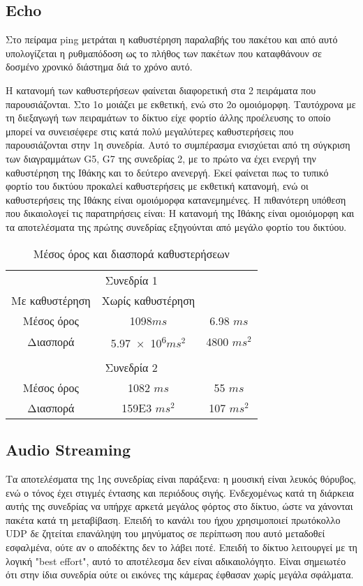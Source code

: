 \documentclass[a4paper,10pt]{article}
\begin{document}
\subsection{\foreignlanguage{english}{Echo}}
Στο πείραμα \foreignlanguage{english}{ping} μετράται η καθυστέρηση παραλαβής του πακέτου και από αυτό υπολογίζεται η ρυθμαπόδοση ως το πλήθος των πακέτων που καταφθάνουν σε δοσμένο χρονικό διάστημα διά το χρόνο αυτό.

Η κατανομή των καθυστερήσεων φαίνεται διαφορετική στα 2 πειράματα που παρουσιάζονται. Στο 1ο μοιάζει με εκθετική, ενώ στο 2ο ομοιόμορφη. Ταυτόχρονα με τη διεξαγωγή των πειραμάτων το δίκτυο είχε φορτίο άλλης προέλευσης το οποίο μπορεί να συνεισέφερε στις κατά πολύ μεγαλύτερες καθυστερήσεις που παρουσιάζονται στην 1η συνεδρία. Αυτό το συμπέρασμα ενισχύεται από τη σύγκριση των διαγραμμάτων \foreignlanguage{english}{G5, G7} της συνεδρίας 2, με το πρώτο να έχει ενεργή την καθυστέρηση της Ιθάκης και το δεύτερο ανενεργή. Εκεί φαίνεται πως το τυπικό φορτίο του δικτύου προκαλεί καθυστερήσεις με εκθετική κατανομή, ενώ οι καθυστερήσεις της Ιθάκης είναι ομοιόμορφα κατανεμημένες. Η πιθανότερη υπόθεση που δικαιολογεί τις παρατηρήσεις είναι: Η κατανομή της Ιθάκης είναι ομοιόμορφη και τα αποτελέσματα της πρώτης συνεδρίας εξηγούνται από μεγάλο φορτίο του δικτύου.

\begin{table}
	\centering
	\begin{tabular}{c|cc}
	  \multicolumn{3}{c}{Συνεδρία 1}\\
		Με καθυστέρηση & Χωρίς καθυστέρηση\\
		\hline
		Μέσος όρος & \num{1098}$ms$ & \num{6.98} $ms$\\
		Διασπορά & \num{5.97e+6}$ms^2$ & \num{4800} $ms^2$\\
		\\
		\multicolumn{3}{c}{Συνεδρία 2}\\
		\hline
		Μέσος όρος & \num{1082} $ms$ & \num{55} $ms$\\
		Διασπορά & \num{159E3} $ms^2$ & \num{107} $ms^2$
	\end{tabular}

	\caption{Μέσος όρος και διασπορά καθυστερήσεων}
\end{table}

\subsection{\foreignlanguage{english}{Audio Streaming}}
Τα αποτελέσματα της 1ης συνεδρίας είναι παράξενα: η μουσική είναι λευκός θόρυβος, ενώ ο τόνος έχει στιγμές έντασης και περιόδους σιγής. Ενδεχομένως κατά τη διάρκεια αυτής της συνεδρίας να υπήρχε αρκετά μεγάλος φόρτος στο δίκτυο, ώστε να χάνονται πακέτα κατά τη μεταβίβαση.
Επειδή το κανάλι του ήχου χρησιμοποιεί πρωτόκολλο \foreignlanguage{english}{UDP} δε ζητείται επανάληψη του μηνύματος σε περίπτωση που αυτό μεταδοθεί εσφαλμένα, ούτε αν ο αποδέκτης δεν το λάβει ποτέ.
Επειδή το δίκτυο λειτουργεί με τη λογική \foreignlanguage{english}{"best effort"}, αυτό το αποτέλεσμα δεν είναι αδικαιολόγητο. Είναι σημειωτέο ότι στην ίδια συνεδρία ούτε οι εικόνες της κάμερας έφθασαν χωρίς μεγάλα σφάλματα.
\end{document}
